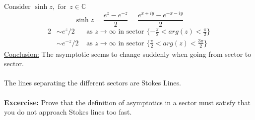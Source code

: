 \documentclass{article}
\begin{document}
\\
Consider $\sinh z, \mbox{ for }\, z \in \mathbb{C} $
\[ \sinh z = \frac{e^z- e^{-z}}{2} = \frac{e^{x+iy} - e^{-x-iy}}{2} \]
\begin{alignat*}{2}
& \sim  e^z/2 &\mbox{ as } z \to \infty \mbox{ in sector } \{ -\frac{\pi}{2}
< arg(z) < \frac{\pi}{2} \} \\
& \sim  e^{-z}/2 &\mbox{ as } z \to \infty \mbox{ in sector } \{ \frac{\pi}{2}
< arg(z) < \frac{3\pi}{2} \} 
\end{alignat*}
\underline{Conclusion:} The asymptotic seems to change suddenly when going from
sector to sector. %
\\
\\
The lines separating the different sectors are Stokes Lines.
\\
\\
\textbf{Excercise:} Prove that the definition of asymptotics in a sector must satisfy
that you do not approach Stokes lines too fast.
\end{document}
